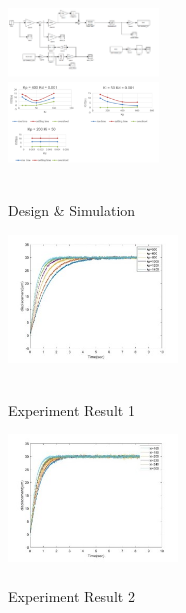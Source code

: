 \documentclass[10pt, letterpaper]{article}
\begin{document}
\begin{figure}[!b]
        \vspace{0.3cm}

        \begin{minipage}[c]{0.33\linewidth}
            \centering
            \includegraphics[width=4cm]{fig/Monographic Study/設計控制器.png} \\
            \includegraphics[width=4cm]{fig/Monographic Study/控制器模擬.png}
            \caption{\\Design \& Simulation}
        \end{minipage}
        \begin{minipage}[c]{0.33\linewidth}
            \centering
            \includegraphics[width=4.5cm]{fig/Monographic Study/控制實驗結果-1.jpg} 
            \caption{\\Experiment Result 1}
        \end{minipage}
        \begin{minipage}[c]{0.33\linewidth}
            \centering
            \includegraphics[width=4.5cm]{fig/Monographic Study/控制實驗結果-2.jpg} 
            \caption{\\Experiment Result 2}
        \end{minipage} 
        \vspace{1.5cm} %
    \end{figure}
\end{document}
